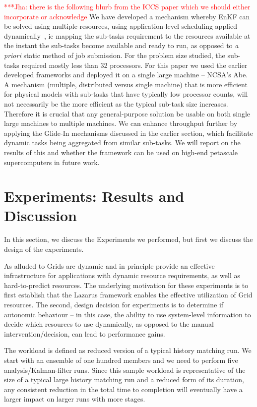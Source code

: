 \documentclass[conference,final]{IEEEtran}
\newcommand{\jhanote}[1]{ {\textcolor{red} { ***Jha: #1 }}}
\newcommand{\yyenote}[1]{ {\textcolor{blue} { ***yye00: #1 }}}
\newcommand{\jhanote}[1]{}
\newcommand{\yyenote}[1]{}
\begin{document}
\jhanote{there is the following blurb from the ICCS paper which we
  should either incorporate or acknowledge} We have developed a
mechanism whereby EnKF can be solved using multiple-resources, using
application-level scheduling applied dynamically~\cite{saga_tg08}, ie
mapping the sub-tasks requirement to the resources available at the
instant the sub-tasks become available and ready to run, as opposed to
{\it a priori} static method of job submission.  For the problem size
studied, the sub-tasks required mostly less than 32 processors. For
this paper we used the earlier developed frameworks and deployed it on
a single large machine -- NCSA's Abe. A mechanism (multiple,
distributed versus single machine) that is more efficient for physical
models with sub-tasks that have typically low processor counts, will
not necessarily be the more efficient as the typical sub-task size
increases. Therefore it is crucial that any general-purpose solution
be usable on both single large machines to multiple machines.  We can
enhance throughput further by applying the Glide-In mechanisms
discussed in the earlier section, which facilitate dynamic tasks being
aggregated from similar sub-tasks. We will report on the results of
this and whether the framework can be used on high-end petascale
supercomputers in future work.


\section{Experiments: Results and Discussion}

In this section, we discuss the Experiments we performed, but first
we discuss the design of the experiments.

As alluded to Grids are dynamic and in principle provide an effective
infrastructure for applications with dynamic resource requirements, as
well as hard-to-predict resources. The underlying motivation for these
experiments is to first establish that the Lazarus framework enables
the effective utilization of Grid resources. The second, design
decision for experiments is to determine if autonomic behaviour -- in
this case, the ability to use system-level information to decide which
resources to use dynamically, as opposed to the manual
intervention/decision, can lead to performance gains.


The workload is defined as reduced version of a typical history
matching run. We start with an ensemble of one hundred members and we
need to perform five analysis/Kalman-filter runs. Since this sample
workload is representative of the size of a typical large history
matching run and a reduced form of its duration, any consistent
reduction in the total time to completion will eventually have a
larger impact on larger runs with more stages.
\end{document}
